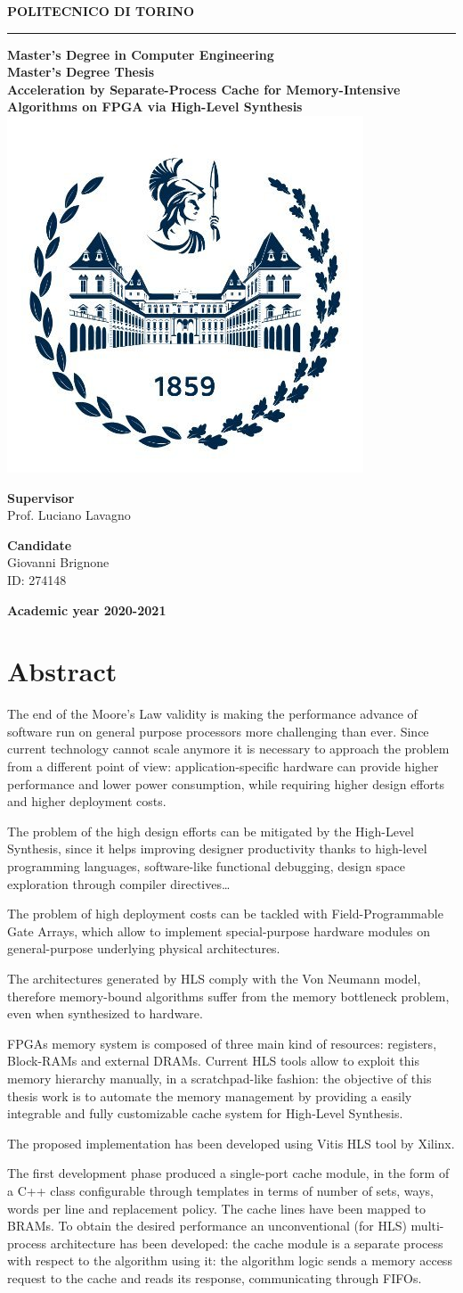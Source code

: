 \documentclass[11pt,a4paper]{memoir}
\renewcommand*{\maketitle}%
{
	\newgeometry{left=2cm,right=2cm,top=3cm,bottom=3.5cm}

	\begin{center}
		\begingroup
		{\Huge\textbf{POLITECNICO DI TORINO}}\\[\baselineskip]
		\rule{\textwidth}{2pt}\par
		\vspace*{1em}
		{\LARGE\textbf{Master's Degree in Computer Engineering}}\\[\baselineskip]
		\vspace*{1em}
		{\Large\textbf{Master's Degree Thesis}}\\
		\vspace*{2cm}
		{\huge\textbf{Acceleration by Separate-Process Cache for
		Memory-Intensive Algorithms on FPGA via High-Level Synthesis}}\\
		\vspace*{1cm}
		\includegraphics[width=.3\textwidth]{figures/polito-logo}
	\end{center}
	\vfill
	\begin{minipage}{0.4\textwidth}
		\begin{flushleft}
			{\Large
				\textbf{Supervisor}\\
				Prof. Luciano Lavagno
			}
		\end{flushleft}
	\end{minipage}
	\begin{minipage}{0.4\textwidth}
		\begin{flushright} 
			{\Large
				\textbf{Candidate}\\
				Giovanni Brignone\\
				ID: 274148
			}
		\end{flushright}
	\end{minipage}  
	\vspace*{2cm}
	\begin{center}
		{\Large\textbf{Academic year 2020-2021}}
	\end{center}
	\endgroup

	\restoregeometry 
}
\begin{document}
\pagestyle{empty}
\maketitle

\frontmatter
\chapter*{Abstract}
The end of the Moore's Law validity is making the performance advance of
software run on general purpose processors more challenging than ever.
Since current technology cannot scale anymore it is necessary to approach the
problem from a different point of view: application-specific hardware can
provide higher performance and lower power consumption, while requiring higher
design efforts and higher deployment costs.

The problem of the high design efforts can be mitigated by the High-Level
Synthesis, since it helps improving designer productivity thanks to high-level
programming languages, software-like functional debugging, design space
exploration through compiler directives\ldots

The problem of high deployment costs can be tackled with Field-Programmable
Gate Arrays, which allow to implement special-purpose hardware modules on
general-purpose underlying physical architectures.

\bigskip
The architectures generated by HLS comply with the Von Neumann model, therefore
memory-bound algorithms suffer from the memory bottleneck problem, even when
synthesized to hardware.

FPGAs memory system is composed of three main kind of resources: registers,
Block-RAMs and external DRAMs.
Current HLS tools allow to exploit this memory hierarchy manually, in a
scratchpad-like fashion: the objective of this thesis work is to automate the
memory management by providing a easily integrable and fully customizable cache
system for High-Level Synthesis.

\bigskip
The proposed implementation has been developed using Vitis HLS tool by Xilinx.

The first development phase produced a single-port cache module, in the form of
a C++ class configurable through templates in terms of number of sets, ways,
words per line and replacement policy.
The cache lines have been mapped to BRAMs.
To obtain the desired performance an unconventional (for HLS) multi-process
architecture has been developed: the cache module is a separate process with
respect to the algorithm using it: the algorithm logic sends a memory access
request to the cache and reads its response, communicating through FIFOs.
\end{document}
